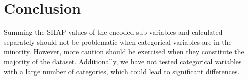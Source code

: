 \documentclass[11pt]{article}
\begin{document}
\section*{Conclusion}
Summing the SHAP values of the encoded sub-variables and calculated separately should not be problematic 
when categorical variables are in the minority. However, more caution should be exercised when they 
constitute the majority of the dataset. Additionally, we have not tested categorical variables with a large 
number of categories, which could lead to significant differences.

\newpage

\end{document}
